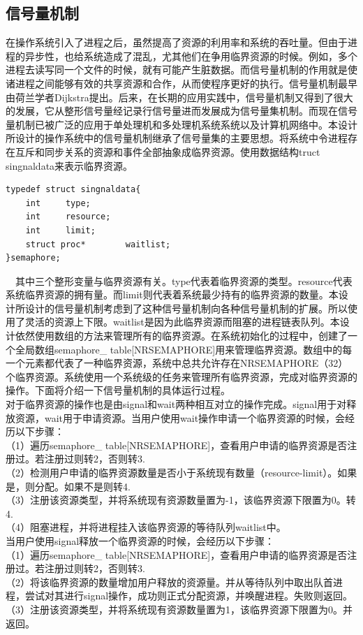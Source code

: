 \documentclass[UTF8,nofonts,cs4size]{ctexrep}
\begin{document}
\subsection{信号量机制}
在操作系统引入了进程之后，虽然提高了资源的利用率和系统的吞吐量。但由于进程的异步性，也给系统造成了混乱，尤其他们在争用临界资源的时候。例如，多个进程去读写同一个文件的时候，就有可能产生脏数据。而信号量机制的作用就是使诸进程之间能够有效的共享资源和合作，从而使程序更好的执行。信号量机制最早由荷兰学者Dijkstra提出。后来，在长期的应用实践中，信号量机制又得到了很大的发展，它从整形信号量经记录行信号量进而发展成为信号量集机制。而现在信号量机制已被广泛的应用于单处理机和多处理机系统系统以及计算机网络中。本设计所设计的操作系统中的信号量机制继承了信号量集的主要思想。将系统中令进程存在互斥和同步关系的资源和事件全部抽象成临界资源。使用数据结构truct singnaldata来表示临界资源。
\begin{lstlisting}
typedef struct singnaldata{
	int		type;
	int		resource;
	int		limit;
    struct proc*		waitlist;
}semaphore;
\end{lstlisting}
\indent \ \ 
其中三个整形变量与临界资源有关。type代表着临界资源的类型。resource代表系统临界资源的拥有量。而limit则代表着系统最少持有的临界资源的数量。本设计所设计的信号量机制考虑到了这种信号量机制向各种信号量机制的扩展。所以使用了灵活的资源上下限。waitlist是因为此临界资源而阻塞的进程链表队列。本设计依然使用数组的方法来管理所有的临界资源。在系统初始化的过程中，创建了一个全局数组semaphore\_ table[NRSEMAPHORE]用来管理临界资源。数组中的每一个元素都代表了一种临界资源，系统中总共允许存在NRSEMAPHORE（32）个临界资源。系统使用一个系统级的任务来管理所有临界资源，完成对临界资源的操作。下面将介绍一下信号量机制的具体运行过程。
\\
\indent 对于临界资源的操作也是由signal和wait两种相互对立的操作完成。signal用于对释放资源，wait用于申请资源。当用户使用wait操作申请一个临界资源的时候，会经历以下步骤：
\\ \indent （1）遍历semaphore\_ table[NRSEMAPHORE]，查看用户申请的临界资源是否注册过。若注册过则转2，否则转3.
\\ \indent （2）检测用户申请的临界资源数量是否小于系统现有数量（resource-limit）。如果是，则分配。如果不是则转4.
\\ \indent （3）注册该资源类型，并将系统现有资源数量置为-1，该临界资源下限置为0。转4.
\\ \indent （4）阻塞进程，并将进程挂入该临界资源的等待队列waitlist中。
\\
\indent 当用户使用signal释放一个临界资源的时候，会经历以下步骤：
\\ \indent （1）遍历semaphore\_ table[NRSEMAPHORE]，查看用户申请的临界资源是否注册过。若注册过则转2，否则转3.
\\ \indent （2）将该临界资源的数量增加用户释放的资源量。并从等待队列中取出队首进程，尝试对其进行signal操作，成功则正式分配资源，并唤醒进程。失败则返回。
\\ \indent （3）注册该资源类型，并将系统现有资源数量置为1，该临界资源下限置为0。并返回。
\end{document}
